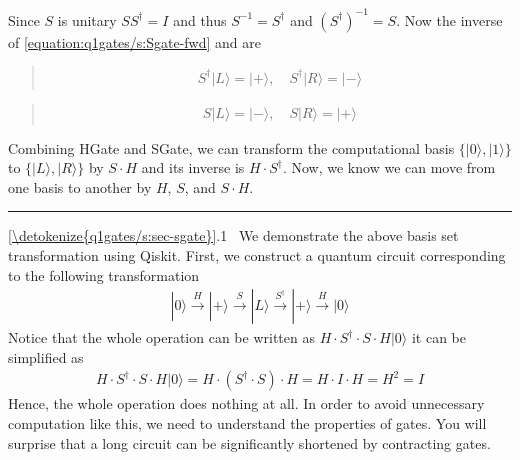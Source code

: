 \documentclass[letterpaper,10pt,english]{jupyterBook}
\begin{document}
\sphinxAtStartPar
Since \(S\) is unitary \(S S^\dagger = I\) and thus \(S^{-1}=S^\dagger\) and \((S^\dagger)^{-1} = S\).  Now the inverse of \eqref{equation:q1gates/s:Sgate-fwd} and  are
\begin{quote}
\begin{equation}\label{equation:q1gates/s:Sgate-inv}
\begin{split}
S^\dagger |L\rangle = |+\rangle, \quad S^\dagger|R\rangle = |-\rangle
\end{split}
\end{equation}\end{quote}
\begin{quote}
\begin{equation}\label{equation:q1gates/s:SdgGate-inv}
\begin{split}
S|L\rangle = |-\rangle, \quad S|R\rangle = |+\rangle
\end{split}
\end{equation}\end{quote}

\sphinxAtStartPar
Combining HGate and SGate, we can transform the computational basis \(\{|0\rangle, |1\rangle\}\) to \(\{|L\rangle, |R\rangle\}\) by \(S \cdot H\) and its inverse is \(H \cdot S^\dagger\).  Now, we know we can move from one basis to another by \(H\), \(S\), and \(S \cdot H\).


\bigskip\hrule\bigskip


\sphinxAtStartPar
{} \hyperref[\detokenize{q1gates/s:sec-sgate}]{\ref{\detokenize{q1gates/s:sec-sgate}}}.1  We demonstrate the above basis set transformation using Qiskit.  First, we construct a quantum circuit corresponding to the following transformation
\begin{equation*}
\begin{split}
|0\rangle \xrightarrow{H} |+\rangle \xrightarrow{S} |L\rangle \xrightarrow{S^\dagger} |+\rangle \xrightarrow{H} |0\rangle
\end{split}
\end{equation*}
\sphinxAtStartPar
Notice that the whole operation can be written as \(H \cdot S^\dagger \cdot S \cdot H |0\rangle\) it can be simplified as
\begin{equation*}
\begin{split}
H \cdot S^\dagger \cdot S \cdot H |0\rangle = H \cdot (S^\dagger \cdot S) \cdot H = H \cdot I \cdot H = H^2 = I
\end{split}
\end{equation*}
\sphinxAtStartPar
Hence, the whole operation does nothing at all.  In order to avoid unnecessary computation like this, we need to understand the properties of gates.  You will surprise that a long circuit can be significantly shortened by contracting gates.
\end{document}

